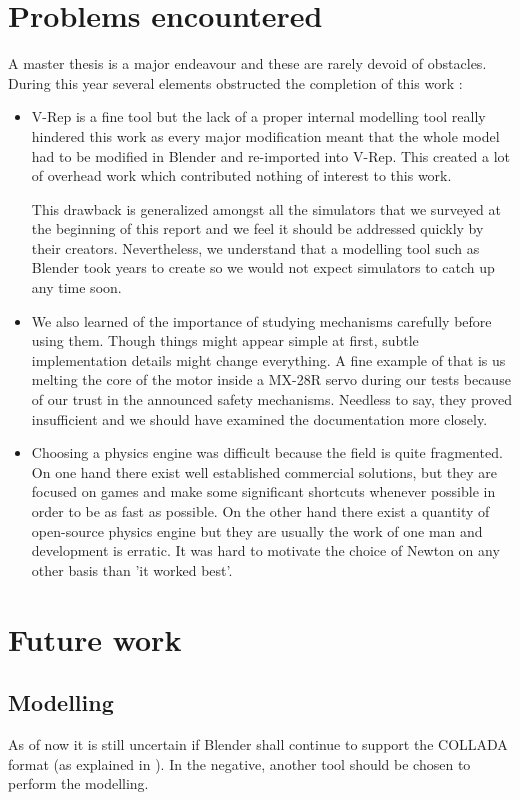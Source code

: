 \section{Problems encountered}
A master thesis is a major endeavour and these are rarely devoid of obstacles. During this year several elements obstructed the completion of this work : \begin{itemize}
\item V-Rep is a fine tool but the lack of a proper internal modelling tool really hindered this work as every major modification meant that the whole model had to be modified in Blender and re-imported into V-Rep. This created a lot of overhead work which contributed nothing of interest to this work. 

This drawback is generalized amongst all the simulators that we surveyed at the beginning of this report and we feel it should be addressed quickly by their creators. Nevertheless, we understand that a modelling tool such as Blender took years to create so we would not expect simulators to catch up any time soon.

\item We also learned of the importance of studying mechanisms carefully before using them. Though things might appear simple at first, subtle implementation details might change everything. A fine example of that is us melting the core of the motor inside a MX-28R servo during our tests because of our trust in the announced safety mechanisms. Needless to say, they proved insufficient and we should have examined the documentation more closely.

\item Choosing a physics engine was difficult because the field is quite fragmented. On one hand there exist well established commercial solutions, but they are focused on games and make some significant shortcuts whenever possible in order to be as fast as possible. On the other hand there exist a quantity of open-source physics engine but they are usually the work of one man and development is erratic. It was hard to motivate the choice of Newton on any other basis than 'it worked best'.
\end{itemize}


\section{Future work}
\subsection{Modelling}
As of now it is still uncertain if Blender shall continue to support the COLLADA format (as explained in \cite{blender_roadmap}). In the negative, another tool should be chosen to perform the modelling.

